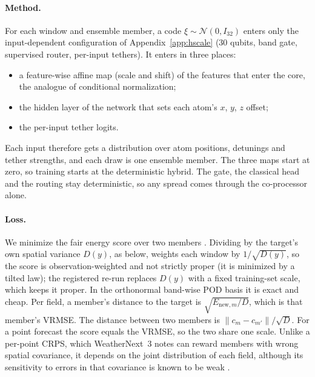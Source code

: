 \documentclass{article}
\begin{document}
\paragraph{Method.} For each window and ensemble member, a code $\xi\sim\mathcal N(0, I_{32})$ enters only the
input-dependent configuration of Appendix~\ref{app:hscale} (30 qubits, band gate, supervised router, per-input
tethers). It enters in three places:
\begin{itemize}
  \item a feature-wise affine map (scale and shift) of the features that enter the core, the analogue of conditional normalization;
  \item the hidden layer of the network that sets each atom's $x$, $y$, $z$ offset;
  \item the per-input tether logits.
\end{itemize}
Each input therefore gets a distribution over atom positions, detunings and tether strengths, and each draw is one
ensemble member. The three maps start at zero, so training starts at the deterministic hybrid. The gate, the classical
head and the routing stay deterministic, so any spread comes through the co-processor alone.

\paragraph{Loss.} We minimize the fair energy score over two members \citep{gneiting2007scoring}. Dividing by the
target's own spatial variance $D(y)$, as below, weights each window by $1/\sqrt{D(y)}$, so the score is observation-weighted
and not strictly proper (it is minimized by a tilted law); the registered re-run replaces $D(y)$ with a fixed
training-set scale, which keeps it proper. In the orthonormal band-wise POD basis it is exact and cheap. Per field, a member's
distance to the target is $\sqrt{E_{\text{new},m}/D}$, which is that member's VRMSE. The distance between two members
is $\lVert c_m-c_{m'}\rVert/\sqrt D$. For a point forecast the score equals the VRMSE, so the two share one scale.
Unlike a per-point CRPS, which WeatherNext~3 notes can reward members with wrong spatial covariance, it depends on the
joint distribution of each field, although its sensitivity to errors in that covariance is known to be weak
\citep{pinson2013energy}.
\end{document}
